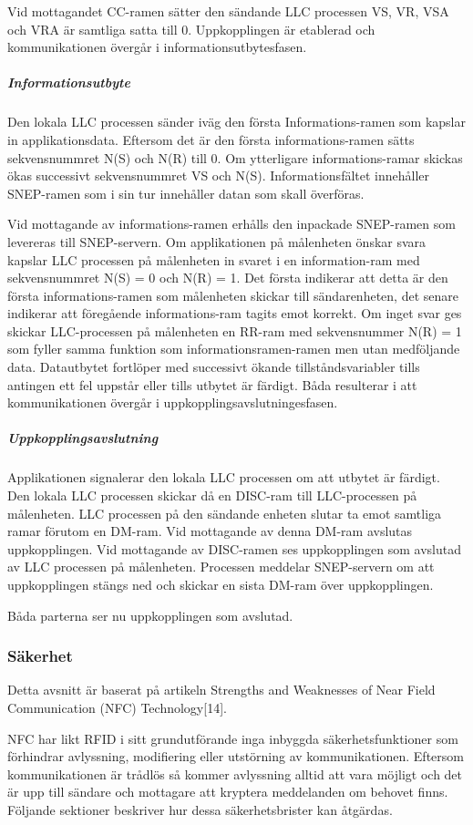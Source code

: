 \documentclass[11pt]{article}
\begin{document}
Vid mottagandet CC-ramen sätter den sändande LLC processen VS, VR, VSA och VRA är samtliga satta till 0. Uppkopplingen är etablerad och kommunikationen övergår i informationsutbytesfasen.

\subparagraph{Informationsutbyte}
Den lokala LLC processen sänder  iväg den första Informations-ramen som kapslar in applikationsdata. Eftersom det är den första informations-ramen sätts sekvensnummret N(S) och N(R) till 0. Om ytterligare informations-ramar skickas ökas successivt sekvensnummret VS och N(S). Informationsfältet innehåller SNEP-ramen som i sin tur innehåller datan som skall överföras.

Vid mottagande av informations-ramen erhålls den inpackade SNEP-ramen som levereras till SNEP-servern. Om applikationen på målenheten önskar svara kapslar LLC processen på målenheten in svaret i en information-ram med sekvensnummret N(S) = 0 och N(R) = 1. Det första indikerar att detta är den första informations-ramen som målenheten skickar till sändarenheten, det senare indikerar att föregående informations-ram tagits emot korrekt. Om inget svar ges skickar LLC-processen på målenheten en RR-ram med sekvensnummer N(R) = 1 som fyller samma funktion som informationsramen-ramen men utan medföljande data. Datautbytet fortlöper med successivt ökande tillståndsvariabler tills antingen ett fel uppstår eller tills utbytet är färdigt. Båda resulterar i att kommunikationen övergår i uppkopplingsavslutningesfasen.

\subparagraph{Uppkopplingsavslutning}
Applikationen signalerar den lokala LLC processen om att utbytet är färdigt. Den lokala LLC processen skickar då en DISC-ram till LLC-processen på målenheten. LLC processen på den sändande enheten slutar ta emot samtliga ramar förutom en DM-ram. Vid mottagande av denna DM-ram avslutas uppkopplingen. 
Vid mottagande av DISC-ramen ses uppkopplingen som avslutad av LLC processen på målenheten. Processen meddelar SNEP-servern om att uppkopplingen stängs ned och skickar en sista DM-ram över uppkopplingen.

Båda parterna ser nu uppkopplingen som avslutad.


\subsubsection{Säkerhet}
Detta avsnitt är baserat på artikeln Strengths and Weaknesses of Near Field Communication (NFC) Technology[14].

NFC har likt RFID i sitt grundutförande inga inbyggda säkerhetsfunktioner som förhindrar avlyssning, modifiering eller utstörning av kommunikationen. Eftersom kommunikationen är trådlös så kommer avlyssning alltid att vara möjligt och det är upp till sändare och mottagare att kryptera meddelanden om behovet finns. Följande sektioner beskriver hur dessa säkerhetsbrister kan åtgärdas. 
\end{document}
